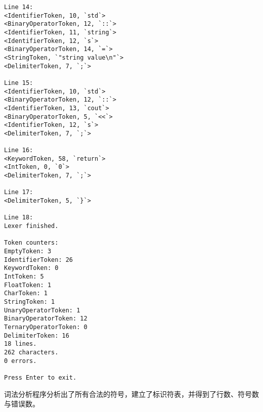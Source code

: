 \documentclass[UTF8]{ctexart}
\begin{document}
\begin{verbatim}
Line 14:
<IdentifierToken, 10, `std`>
<BinaryOperatorToken, 12, `::`>
<IdentifierToken, 11, `string`>
<IdentifierToken, 12, `s`>
<BinaryOperatorToken, 14, `=`>
<StringToken, `"string value\n"`>
<DelimiterToken, 7, `;`>

Line 15:
<IdentifierToken, 10, `std`>
<BinaryOperatorToken, 12, `::`>
<IdentifierToken, 13, `cout`>
<BinaryOperatorToken, 5, `<<`>
<IdentifierToken, 12, `s`>
<DelimiterToken, 7, `;`>

Line 16:
<KeywordToken, 58, `return`>
<IntToken, 0, `0`>
<DelimiterToken, 7, `;`>

Line 17:
<DelimiterToken, 5, `}`>

Line 18:
Lexer finished.

Token counters:
EmptyToken: 3
IdentifierToken: 26
KeywordToken: 0
IntToken: 5
FloatToken: 1
CharToken: 1
StringToken: 1
UnaryOperatorToken: 1
BinaryOperatorToken: 12
TernaryOperatorToken: 0
DelimiterToken: 16
18 lines.
262 characters.
0 errors.

Press Enter to exit.
\end{verbatim}
词法分析程序分析出了所有合法的符号，建立了标识符表，并得到了行数、符号数与错误数。
\end{document}
